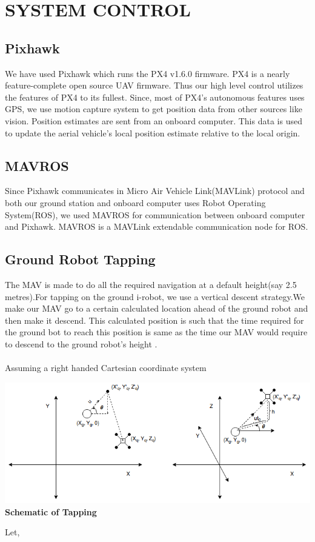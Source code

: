 \documentclass[12pt]{article}
\begin{document}
\section{SYSTEM CONTROL}
\subsection{Pixhawk}
    We have used Pixhawk which runs the PX4 v1.6.0 firmware. PX4 is a nearly feature-complete open source UAV firmware. Thus our high level control utilizes the features of PX4 to its fullest. Since, most of PX4’s autonomous features uses GPS, we use motion capture system to get position data from other sources like vision. Position estimates are sent from an onboard computer. This data is used to update the aerial vehicle's local position estimate relative to the local origin.  
\subsection{MAVROS}
    Since Pixhawk communicates in Micro Air Vehicle Link(MAVLink) protocol and both our ground station and onboard computer uses Robot Operating System(ROS), we used MAVROS for communication between onboard computer and Pixhawk. MAVROS is a MAVLink extendable communication node for ROS.
\subsection{Ground Robot Tapping}
    The MAV is made to do all the required navigation at a default height(say 2.5 metres).For tapping on the ground i-robot, we use a vertical descent strategy.We make our MAV go to a certain calculated location ahead of the ground robot and then make it descend. This calculated position is such that the time required for the ground bot to reach this position is same as the time our MAV would require to descend to the ground robot's height .\\
\\ Assuming a right handed Cartesian coordinate system 
\begin{center}
\includegraphics[scale=0.5]{tap}\\
\textbf{Schematic of Tapping}
\end{center}
Let,
    
\end{document}
